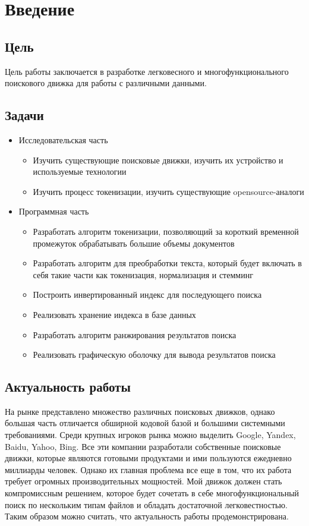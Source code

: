 \section{Введение}
\subsection{Цель}
Цель работы заключается в разработке легковесного и многофункционального поискового движка для работы с различными данными. 

\subsection{Задачи}
\begin{itemize}
  \item{Исследовательская часть}
    \begin{itemize}
        \item {Изучить существующие поисковые движки, изучить их устройство и используемые технологии}
        \item {Изучить процесс токенизации, изучить существующие opensource-аналоги}
    \end{itemize}
  \item{Программная часть}
      \begin{itemize}
        \item{Разработать алгоритм токенизации, позволяющий за короткий временной промежуток обрабатывать большие объемы документов}
        \item {Разработать алгоритм для преобработки текста, который будет включать в себя такие части как токенизация, нормализация и стемминг}
        \item {Построить инвертированный индекс для последующего поиска}
        \item {Реализовать хранение индекса  в базе данных}
        \item {Разработать алгоритм ранжирования результатов поиска}
        \item{Реализовать графическую оболочку для вывода результатов поиска}
    \end{itemize}
\end{itemize}

\subsection{Актуальность работы}
На рынке представлено множество различных поисковых движков, однако большая часть отличается обширной кодовой базой и 
большими системными требованиями. Среди крупных игроков рынка можно выделить Google, Yandex, Baidu, Yahoo, Bing. 
Все эти компании разработали собственные поисковые движки, которые являются готовыми продуктами и ими пользуются 
ежедневно миллиарды человек. Однако их главная  проблема все еще в том, что их работа требует огромных производительных 
мощностей. Мой движок должен стать компромиссным решением, которое будет сочетать в себе многофункциональный поиск 
по нескольким типам файлов и обладать достаточной легковестностью. Таким образом можно считать, 
что актуальность работы продемонстрирована.

